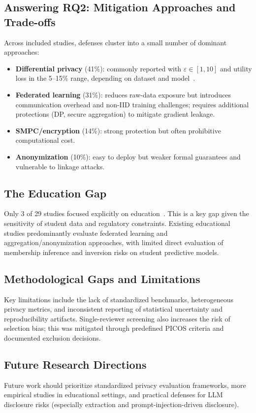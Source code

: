 \documentclass[conference]{IEEEtran}
\begin{document}
\subsection{Answering RQ2: Mitigation Approaches and Trade-offs}
Across included studies, defenses cluster into a small number of dominant approaches:
\begin{itemize}
  \item \textbf{Differential privacy} (41\%): commonly reported with $\varepsilon \in [1,10]$ and utility loss in the 5--15\% range, depending on dataset and model~\cite{abadi2016deep,li2024differentially}.
  \item \textbf{Federated learning} (31\%): reduces raw-data exposure but introduces communication overhead and non-IID training challenges; requires additional protections (DP, secure aggregation) to mitigate gradient leakage.
  \item \textbf{SMPC/encryption} (14\%): strong protection but often prohibitive computational cost.
  \item \textbf{Anonymization} (10\%): easy to deploy but weaker formal guarantees and vulnerable to linkage attacks.
\end{itemize}

\subsection{The Education Gap}
Only 3 of 29 studies focused explicitly on education~\cite{yu2024privacy,xiao2023secure,gursoy2022privacy}. This is a key gap given the sensitivity of student data and regulatory constraints. Existing educational studies predominantly evaluate federated learning and aggregation/anonymization approaches, with limited direct evaluation of membership inference and inversion risks on student predictive models.

\subsection{Methodological Gaps and Limitations}
Key limitations include the lack of standardized benchmarks, heterogeneous privacy metrics, and inconsistent reporting of statistical uncertainty and reproducibility artifacts. Single-reviewer screening also increases the risk of selection bias; this was mitigated through predefined PICOS criteria and documented exclusion decisions.

\subsection{Future Research Directions}
Future work should prioritize standardized privacy evaluation frameworks, more empirical studies in educational settings, and practical defenses for LLM disclosure risks (especially extraction and prompt-injection-driven disclosure).
\end{document}
